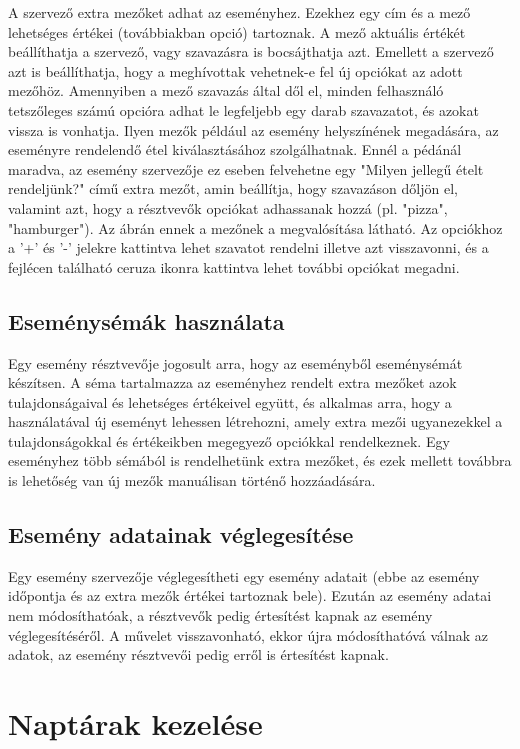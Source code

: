 \documentclass[a4paper,12pt]{report}
\theoremstyle{definition}
\theoremstyle{remark}
\begin{document}
A szervező extra mezőket adhat az eseményhez. Ezekhez egy cím és a mező lehetséges értékei (továbbiakban opció) tartoznak. A mező aktuális értékét beállíthatja a szervező, vagy szavazásra is bocsájthatja azt. Emellett a szervező azt is beállíthatja, hogy a meghívottak vehetnek-e fel új opciókat az adott mezőhöz. Amennyiben a mező szavazás által dől el, minden felhasználó tetszőleges számú opcióra adhat le legfeljebb egy darab szavazatot, és azokat vissza is vonhatja. Ilyen mezők például az esemény helyszínének megadására, az eseményre rendelendő étel kiválasztásához szolgálhatnak. Ennél a pédánál maradva, az esemény szervezője ez eseben felvehetne egy "Milyen jellegű ételt rendeljünk?" című extra mezőt, amin beállítja, hogy szavazáson dőljön el, valamint azt, hogy a résztvevők opciókat adhassanak hozzá (pl. "pizza", "hamburger").  Az ábrán ennek a mezőnek a megvalósítása látható. Az opciókhoz a '+' és '-' jelekre kattintva lehet szavatot rendelni illetve azt visszavonni, és a fejlécen található ceruza ikonra kattintva lehet további opciókat megadni.

	\subsection{Eseménysémák használata}

Egy esemény résztvevője jogosult arra, hogy az eseményből eseménysémát készítsen. A séma tartalmazza az eseményhez rendelt extra mezőket azok tulajdonságaival és lehetséges értékeivel együtt, és alkalmas arra, hogy a használatával új eseményt lehessen létrehozni, amely extra mezői ugyanezekkel a tulajdonságokkal és értékeikben megegyező opciókkal rendelkeznek. Egy eseményhez több sémából is rendelhetünk extra mezőket, és ezek mellett továbbra is lehetőség van új mezők manuálisan történő hozzáadására.

	\subsection{Esemény adatainak véglegesítése}

Egy esemény szervezője véglegesítheti egy esemény adatait (ebbe az esemény időpontja és az extra mezők értékei tartoznak bele).  Ezután az esemény adatai nem módosíthatóak, a résztvevők pedig értesítést kapnak az esemény véglegesítéséről. A művelet visszavonható, ekkor újra módosíthatóvá válnak az adatok, az esemény résztvevői pedig erről is értesítést kapnak.

\section{Naptárak kezelése}
\end{document}
